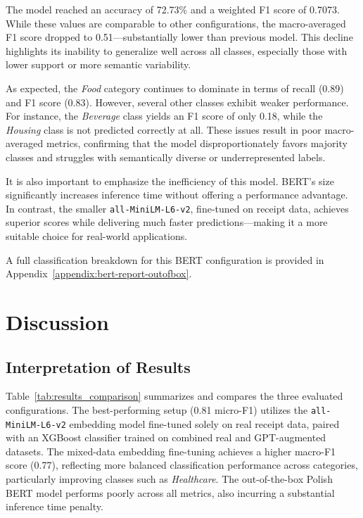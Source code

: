 \documentclass{SGGW-thesis-EN}
\begin{document}
The model reached an accuracy of 72.73\% and a weighted F1 score of 0.7073. While these values are comparable to other configurations, the  
macro-averaged F1 score dropped to 0.51—substantially lower than previous model. This decline highlights  
its inability to generalize well across all classes, especially those with lower support or more semantic variability.

As expected, the \emph{Food} category continues to dominate in terms of recall (0.89) and F1 score (0.83). However, several other classes exhibit  
weaker performance. For instance, the \emph{Beverage} class yields an F1 score of only 0.18, while the \emph{Housing} class is not predicted  
correctly at all. These issues result in poor macro-averaged metrics, confirming that the model disproportionately favors majority classes and  
struggles with semantically diverse or underrepresented labels.

It is also important to emphasize the inefficiency of this model. BERT’s size significantly increases inference time without offering a  
performance advantage. In contrast, the smaller \texttt{all-MiniLM-L6-v2}, fine-tuned on receipt data, achieves superior scores  
 while delivering much faster predictions—making it a more suitable choice for real-world applications.

A full classification breakdown for this BERT configuration is provided in Appendix~\ref{appendix:bert-report-outofbox}.


\chapter{Discussion}

\section{Interpretation of Results}

Table~\ref{tab:results_comparison} summarizes and compares the three evaluated
configurations. The best-performing setup (0.81 micro-F1) utilizes the 
\texttt{all-MiniLM-L6-v2} embedding model fine-tuned solely on real receipt data, 
paired with an XGBoost classifier trained on combined real and GPT-augmented 
datasets. The mixed-data embedding fine-tuning achieves a higher macro-F1 score 
(0.77), reflecting more balanced classification performance across categories, 
particularly improving classes such as \emph{Healthcare}. The out-of-the-box Polish 
BERT model performs poorly across all metrics, also incurring a substantial inference 
time penalty.
\end{document}
